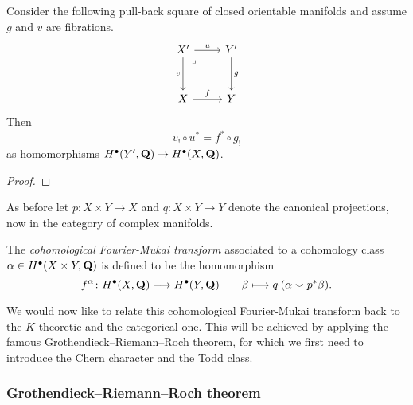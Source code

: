 \begin{proposition}
    Consider the following pull-back square of closed orientable manifolds and assume $g$ and $v$ are fibrations.
    \[\begin{tikzcd}[row sep = 3em]
        {X'} & {Y'} \\
        X & Y
        \arrow["u", from=1-1, to=1-2]
        \arrow["v"', from=1-1, to=2-1]
        \arrow["\lrcorner"{anchor=center, pos=0.125}, draw=none, from=1-1, to=2-2]
        \arrow["g", from=1-2, to=2-2]
        \arrow["f", from=2-1, to=2-2]
    \end{tikzcd}\]
    Then
    \begin{equation}
        \label{eq: cohomological base change}
        v_! \circ u^* = f^* \circ g_!
    \end{equation}
    as homomorphisms $H^{\bullet}(Y', \mathbf Q) \to H^{\bullet}(X, \mathbf Q)$.
\end{proposition}

\begin{proof}
\end{proof}

As before let $p \colon X \times Y \to X$ and $q \colon X \times Y \to Y$ denote the canonical projections, now in the category of complex manifolds. 

\begin{definition}
    The \emph{cohomological Fourier-Mukai transform} associated to a cohomology class $\alpha \in H^{\bullet}(X \times Y, \mathbf Q)$ is defined to be the homomorphism
    \[
        f^\alpha \colon H^{\bullet}(X, \mathbf Q) \longrightarrow H^{\bullet}(Y, \mathbf Q) \qquad \beta \longmapsto q_!(\alpha \smallsmile p^*\beta).
    \]
\end{definition}

We would now like to relate this cohomological Fourier-Mukai transform back to the $K$-theoretic and the categorical one. This will be achieved by applying the famous Grothendieck--Riemann--Roch theorem, 
for which we first need to introduce the Chern character and the Todd class. 

\subsubsection*{Grothendieck--Riemann--Roch theorem}

